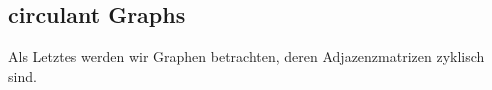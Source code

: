 \subsection{circulant Graphs}
Als Letztes werden wir Graphen betrachten, deren Adjazenzmatrizen zyklisch sind.
\begin{Bsps}
\end{Bsps} 
